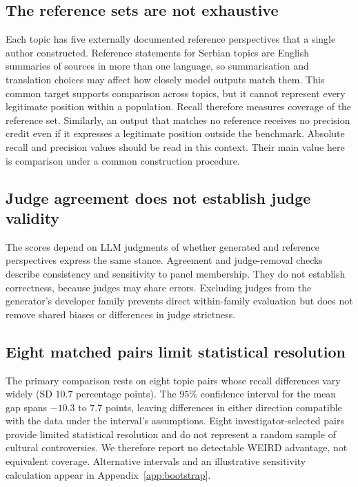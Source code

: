 \documentclass[11pt,a4paper]{article}
\begin{document}
\subsection{The reference sets are not exhaustive}
\label{sec:The reference sets are not exhaustive}
Each topic has five externally documented reference perspectives that a single author constructed. Reference statements for Serbian topics are English summaries of sources in more than one language, so summarisation and translation choices may affect how closely model outputs match them. This common target supports comparison across topics, but it cannot represent every legitimate position within a population. Recall therefore measures coverage of the reference set. Similarly, an output that matches no reference receives no precision credit even if it expresses a legitimate position outside the benchmark. Absolute recall and precision values should be read in this context. Their main value here is comparison under a common construction procedure.

\subsection{Judge agreement does not establish judge validity}
\label{sec:Judge agreement does not establish judge validity}
The scores depend on LLM judgments of whether generated and reference perspectives express the same stance. Agreement and judge-removal checks describe consistency and sensitivity to panel membership. They do not establish correctness, because judges may share errors. Excluding judges from the generator's developer family prevents direct within-family evaluation but does not remove shared biases or differences in judge strictness.

\subsection{Eight matched pairs limit statistical resolution}
\label{sec:Eight matched pairs limit the size of effects we can resolve}
The primary comparison rests on eight topic pairs whose recall differences vary widely (SD $10.7$ percentage points). The $95\%$ confidence interval for the mean gap spans $-10.3$ to $7.7$ points, leaving differences in either direction compatible with the data under the interval's assumptions. Eight investigator-selected pairs provide limited statistical resolution and do not represent a random sample of cultural controversies. We therefore report no detectable WEIRD advantage, not equivalent coverage. Alternative intervals and an illustrative sensitivity calculation appear in Appendix~\ref{app:bootstrap}.
\end{document}
